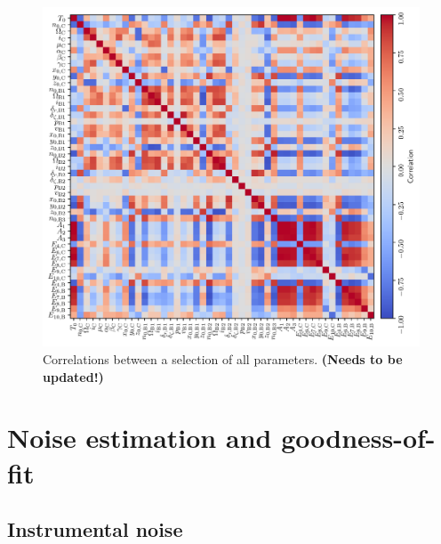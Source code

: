 \documentclass{aa}
\begin{document}
\begin{figure}
    \centering
    \includegraphics[width=1\textwidth]{figs/correlation_matrix.pdf}
    \caption{Correlations between a selection of all parameters. {\bf (Needs to be updated!)}}
    \label{fig:correlations}
\end{figure}


\section{Noise estimation and goodness-of-fit}

\subsection{Instrumental noise}
\end{document}
